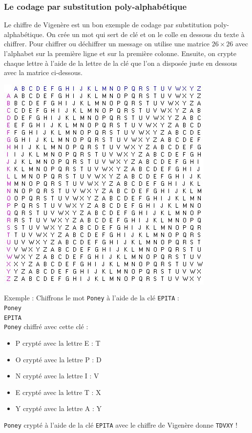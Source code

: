 \documentclass[a4paper,12pt]{article}
\begin{document}
\subsubsection{Le codage par substitution poly-alphabétique}

Le chiffre de Vigenère est un bon exemple de codage par substitution poly-alphabétique. On crée un mot qui sert de clé et on le \og colle \fg{} en dessous du texte à chiffrer. Pour chiffrer ou déchiffrer un message on utilise une matrice $26 \times 26$ avec l'alphabet sur la première ligne et sur la première colonne. Ensuite, on crypte chaque lettre à l'aide de la lettre de la clé que l'on a disposée juste en dessous avec la matrice ci-dessous.

\begin{center}
  \includegraphics[scale=0.5]{../Image/matrice.jpg}
\end{center}

Exemple : Chiffrons le mot \texttt{Poney} à l'aide de la clé \texttt{EPITA} :\\
\texttt{Poney}\\
\texttt{EPITA}\\
\texttt{Poney} chiffré avec cette clé :
\begin{itemize}
\item P crypté avec la lettre E : T
\item O crypté avec la lettre P : D
\item N crypté avec la lettre I : V
\item E crypté avec la lettre T : X
\item Y crypté avec la lettre A : Y
\end{itemize}
\texttt{Poney} crypté à l'aide de la clé \texttt{EPITA} avec le chiffre de Vigenère donne \texttt{TDVXY} !
\end{document}
